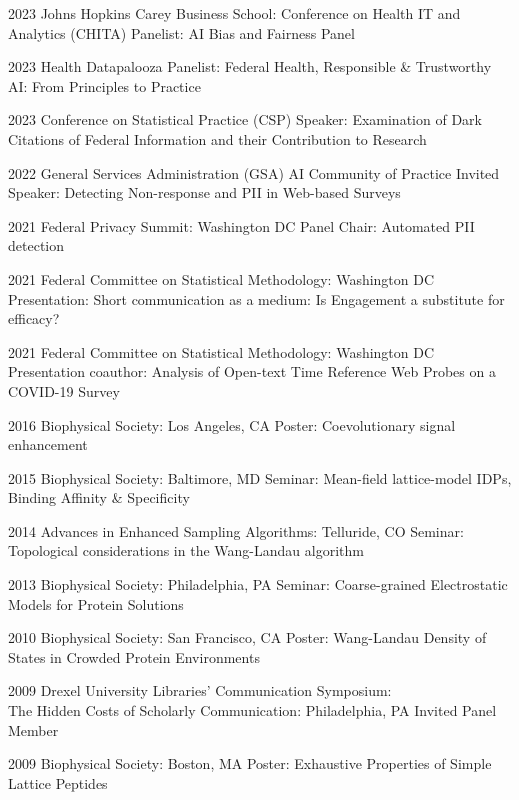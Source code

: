 \documentclass[]{scrartcl}
\begin{document}
\begin{cleanCV}
\WorkExperienceX
{2023}
{Johns Hopkins Carey Business School: Conference on Health IT and Analytics (CHITA)}
{Panelist: AI Bias and Fairness Panel}

\WorkExperienceX
{2023}
{Health Datapalooza}
{Panelist: Federal Health, Responsible \& Trustworthy AI: From Principles to Practice}

\WorkExperienceX
{2023}
{Conference on Statistical Practice (CSP)}
{Speaker: Examination of Dark Citations of Federal Information and their Contribution to Research}

\WorkExperienceX
{2022}
{General Services Administration (GSA) AI Community of Practice}
{Invited Speaker: Detecting Non-response and PII in Web-based Surveys}

\WorkExperienceX
{2021}
{Federal Privacy Summit: Washington DC}
{Panel Chair: Automated PII detection}

\WorkExperienceX
{2021}
{Federal Committee on Statistical Methodology: Washington DC}
{Presentation: Short communication as a medium: Is Engagement a substitute for efficacy?}

\WorkExperienceX
{2021}
{Federal Committee on Statistical Methodology: Washington DC}
{Presentation coauthor: Analysis of Open-text Time Reference Web Probes on a COVID-19 Survey}

\WorkExperienceX
{2016}
{Biophysical Society: Los Angeles, CA}
{Poster: Coevolutionary signal enhancement}


\WorkExperienceX
{2015}
{Biophysical Society: Baltimore, MD}
{Seminar: Mean-field lattice-model IDPs, Binding Affinity \& Specificity}

\WorkExperienceX
{2014}
{Advances in Enhanced Sampling Algorithms: Telluride, CO}
{Seminar: Topological considerations in the Wang-Landau algorithm}

\WorkExperienceX
{2013}
{Biophysical Society: Philadelphia, PA}
{Seminar: Coarse-grained Electrostatic Models for Protein Solutions}

\WorkExperienceX
{2010}
{Biophysical Society: San Francisco, CA}
{Poster: Wang-Landau Density of States in Crowded Protein Environments}

\WorkExperienceX
{2009}
{Drexel University Libraries' Communication Symposium:\\The Hidden Costs of Scholarly Communication: Philadelphia, PA}
{Invited Panel Member}

\WorkExperienceX
{2009}
{Biophysical Society: Boston, MA}
{Poster: Exhaustive Properties of Simple Lattice Peptides}



\end{cleanCV}
\end{document}
